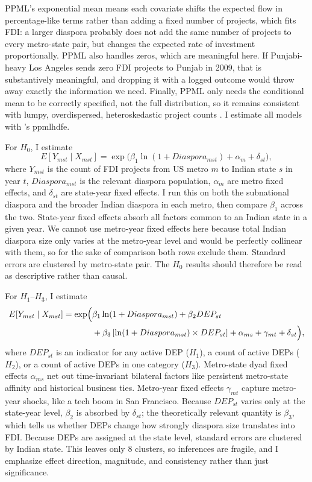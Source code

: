 \documentclass[12pt]{article}
\begin{document}
PPML's exponential mean means each covariate shifts the expected flow in percentage-like terms rather than adding a fixed number of projects, which fits FDI: a larger diaspora probably does not add the same number of projects to every metro-state pair, but changes the expected rate of investment proportionally. PPML also handles zeros, which are meaningful here. If Punjabi-heavy Los Angeles sends zero FDI projects to Punjab in 2009, that is substantively meaningful, and dropping it with a logged outcome would throw away exactly the information we need. Finally, PPML only needs the conditional mean to be correctly specified, not the full distribution, so it remains consistent with lumpy, overdispersed, heteroskedastic project counts \citep{santos_silva_log_2006}. I estimate all models with \citet{correia_fast_2020}'s ppmlhdfe.

For $H_0$, I estimate
\begin{equation}
E[Y_{mst} \mid X_{mst}] = \exp \bigl( \beta_1 \ln(1+Diaspora_{mst}) + \alpha_{m} + \delta_{st} \bigr),
\label{eq:h0}
\end{equation}
where $Y_{mst}$ is the count of FDI projects from US metro $m$ to Indian state $s$ in year $t$, $Diaspora_{mst}$ is the relevant diaspora population, $\alpha_m$ are metro fixed effects, and $\delta_{st}$ are state-year fixed effects. I run this on both the subnational diaspora and the broader Indian diaspora in each metro, then compare $\beta_1$ across the two. State-year fixed effects absorb all factors common to an Indian state in a given year. We cannot use metro-year fixed effects here because total Indian diaspora size only varies at the metro-year level and would be perfectly collinear with them, so for the sake of comparison both rows exclude them. Standard errors are clustered by metro-state pair. The $H_0$ results should therefore be read as descriptive rather than causal.

For $H_1$--$H_3$, I estimate
\begin{equation}
\begin{aligned}
E[Y_{mst} \mid X_{mst}] = \exp \Bigl( &\beta_1 \ln(1+Diaspora_{mst}) + \beta_2 DEP_{st} \\
&+ \beta_3 \left[\ln(1+Diaspora_{mst}) \times DEP_{st}\right] + \alpha_{ms} + \gamma_{mt} + \delta_{st} \Bigr),
\end{aligned}
\label{eq:h1}
\end{equation}
where $DEP_{st}$ is an indicator for any active DEP ($H_1$), a count of active DEPs ($H_2$), or a count of active DEPs in one category ($H_3$). Metro-state dyad fixed effects $\alpha_{ms}$ net out time-invariant bilateral factors like persistent metro-state affinity and historical business ties. Metro-year fixed effects $\gamma_{mt}$ capture metro-year shocks, like a tech boom in San Francisco. Because $DEP_{st}$ varies only at the state-year level, $\beta_2$ is absorbed by $\delta_{st}$; the theoretically relevant quantity is $\beta_3$, which tells us whether DEPs change how strongly diaspora size translates into FDI. Because DEPs are assigned at the state level, standard errors are clustered by Indian state. This leaves only 8 clusters, so inferences are fragile, and I emphasize effect direction, magnitude, and consistency rather than just significance.
\end{document}
